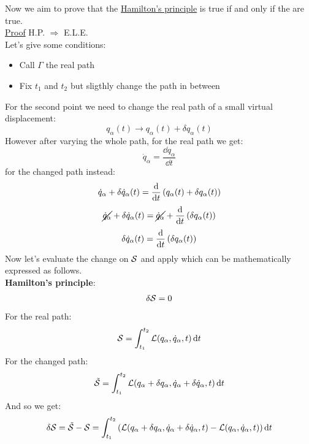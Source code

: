 Now we aim to prove that the \hyperref[q:Hamilton_principle_quote]{Hamilton's principle} is true if and only if the \eleref\;are true.\\
\underline{Proof} H.P. $\Rightarrow$ E.L.E.\\
Let's give some conditions:
\begin{itemize}
    \item Call $\Gamma$ the real path
    \item Fix $t_1$ and $t_2$ but sligthly change the path in between
\end{itemize}
For the second point we need to change the real path of a small virtual displacement:
\begin{equation}
    q_{\alpha}(t) \longrightarrow q_{\alpha}(t) + \delta q_{\alpha}(t)
\end{equation}
However after varying the whole path, for the real path we get:
\begin{equation}
    \dot{q}_{\alpha} = \dfrac{\dd{q_{\alpha}}}{\dd{t}}
\end{equation}
for the changed path instead:
\begin{equation}
    \dot{q}_{\alpha} + \delta \dot{q}_{\alpha}(t) = \dv{}{t}\brackets{q_{\alpha}(t) + \delta q_{\alpha}(t)}
\end{equation}
\begin{equation}
    \cancel{\dot{q}_{\alpha}} + \delta \dot{q}_{\alpha}(t) = \cancel{\dot{q}_{\alpha}} + \dv{}{t}\brackets{\delta q_{\alpha}(t)}
\end{equation}
\begin{equation}
    \delta \dot{q}_{\alpha}(t) = \dv{}{t}\brackets{\delta q_{\alpha}(t)}
\end{equation}
Now let's evaluate the change on $\mathcal{S}$ and apply \hpquoteref\;which can be mathematically expressed as follows.\\\textbf{Hamilton's principle}:
\begin{equation} \label{e:Hamilton_principle}
    \delta \mathcal{S} = 0
\end{equation}
For the real path:
\begin{equation}
    \mathcal{S} = \int_{t_1}^{t_2}\mathcal{L}(q_{\alpha},\dot{q}_{\alpha},t) \dd{t}
\end{equation}
For the changed path:
\begin{equation}
    \tilde{\mathcal{S}} = \int_{t_1}^{t_2}\mathcal{L}(q_{\alpha}+\delta q_{\alpha},\dot{q}_{\alpha} + \delta \dot{q}_{\alpha},t) \dd{t}
\end{equation}
And so we get:
\begin{equation}
    \delta \mathcal{S} = \tilde{\mathcal{S}} - \mathcal{S} = \int_{t_1}^{t_2}\left(\mathcal{L}(q_{\alpha}+\delta q_{\alpha},\dot{q}_{\alpha} + \delta \dot{q}_{\alpha},t) - \mathcal{L}(q_{\alpha},\dot{q}_{\alpha},t)\right) \dd{t}
\end{equation}
